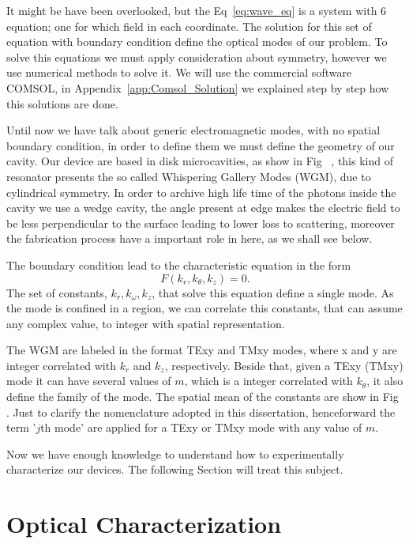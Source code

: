 It might be have been overlooked, but the Eq~\ref{eq:wave_eq} is a system with 6 equation; one for which field in each coordinate. The solution for this set of equation with boundary condition define the optical modes of our problem. To solve this equations we must apply consideration about symmetry, however we use numerical methods to solve it. We will use the commercial software COMSOL\regmark, in Appendix~\ref{app:Comsol_Solution} we explained step by step how this solutions are done. 

Until now we have talk about generic electromagnetic modes, with no spatial boundary condition, in order to define them we must define the geometry of our cavity. Our device are based in disk microcavities, as show in Fig~%
, this kind of resonator presents the so called Whispering Gallery Modes (WGM), due to cylindrical symmetry. In order to archive high life time of the photons inside the cavity we use a wedge cavity, the angle present at edge makes the electric field to be less perpendicular to the surface leading to lower loss to scattering, moreover the fabrication process have a important role in here, as we shall see below. 

The boundary condition lead to the characteristic equation in the form 
\begin{equation}
    F(k_r,k_\theta,k_z) = 0.
\end{equation}
The set of constants, $k_r,k_\omega,k_z$, that solve this equation define a single mode. As the mode is confined in a region, we can correlate this constants, that can assume any complex value, to integer with spatial representation.

The WGM are labeled in the format TExy and TMxy modes, where x and y are integer correlated with $k_r$ and $k_z$, respectively. Beside that, given a TExy (TMxy) mode it can have several values of $m$, which is a integer correlated with $k_\theta$, it also define the family of the mode. The spatial mean of the constants are show in Fig~%
. Just to clarify the nomenclature adopted in this dissertation, henceforward the term '$j$th mode' are applied for a TExy or TMxy mode with any value of $m$. 

Now we have enough knowledge to understand how to experimentally characterize our devices. The following Section will treat this subject. 

\section{Optical Characterization}


